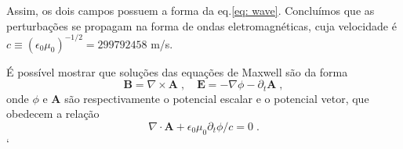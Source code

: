 Assim, os dois campos possuem a forma da eq.\eqref{eq: wave}.
Concluímos que as perturbações se propagam na forma de ondas eletromagnéticas, cuja velocidade é $c \equiv (\epsilon_0 \mu_0)^{-1/2} = 299792458$ m/s.

É possível mostrar que soluções das equações de Maxwell são da forma
\begin{equation}
    \mathbf B = \nabla \times \mathbf A \;, \quad \mathbf E = -\nabla \phi - \partial_t \mathbf A \;,
    \label{eq: maxwell_solutions}
\end{equation}
\noindent onde $\phi$ e $\mathbf A$ são respectivamente o potencial escalar e o potencial vetor, que obedecem a relação
\begin{equation}
    \nabla \cdot \mathbf A + \epsilon_0\mu_0\partial_t \phi /c = 0 \;.
    \label{eq: lorentz_condition}
\end{equation}
`
